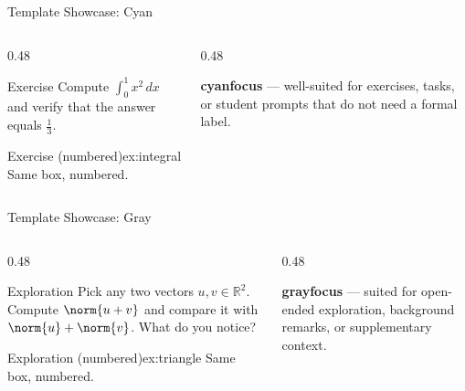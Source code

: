 \cyanheader
\begin{frame}{Template Showcase: Cyan}
\begin{columns}[T]
  \begin{column}{0.48\textwidth}
    \begin{cyanbox*}{Exercise}
      Compute $\displaystyle\int_0^1 x^2\,dx$ and verify that the answer equals $\tfrac{1}{3}$.
    \end{cyanbox*}
    \medskip
    \begin{cyanbox}{Exercise (numbered)}{ex:integral}
      Same box, numbered.
    \end{cyanbox}
  \end{column}
  \begin{column}{0.48\textwidth}
    \begin{cyanfocus}
      \textbf{cyanfocus} --- well-suited for exercises, tasks, or student prompts that do not need a formal label.
    \end{cyanfocus}
  \end{column}
\end{columns}
\end{frame}

\grayheader
\begin{frame}{Template Showcase: Gray}
\begin{columns}[T]
  \begin{column}{0.48\textwidth}
    \begin{graybox*}{Exploration}
      Pick any two vectors $u, v \in \mathbb{R}^2$. Compute $\norm{u+v}$ and compare it with $\norm{u} + \norm{v}$. What do you notice?
    \end{graybox*}
    \medskip
    \begin{graybox}{Exploration (numbered)}{ex:triangle}
      Same box, numbered.
    \end{graybox}
  \end{column}
  \begin{column}{0.48\textwidth}
    \begin{grayfocus}
      \textbf{grayfocus} --- suited for open-ended exploration, background remarks, or supplementary context.
    \end{grayfocus}
  \end{column}
\end{columns}
\end{frame}

